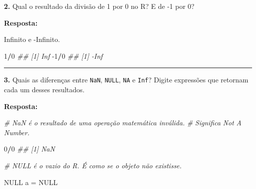 \documentclass[]{book}
\newenvironment{Shaded}{\begin{snugshade}}{\end{snugshade}}
\newcommand{\CommentTok}[1]{\textcolor[rgb]{0.56,0.35,0.01}{\textit{#1}}}
\newcommand{\DecValTok}[1]{\textcolor[rgb]{0.00,0.00,0.81}{#1}}
\newcommand{\NormalTok}[1]{#1}
\newcommand{\OperatorTok}[1]{\textcolor[rgb]{0.81,0.36,0.00}{\textbf{#1}}}
\newcommand{\OtherTok}[1]{\textcolor[rgb]{0.56,0.35,0.01}{#1}}
\newcommand{\StringTok}[1]{\textcolor[rgb]{0.31,0.60,0.02}{#1}}
\begin{document}
\textbf{2.} Qual o resultado da divisão de 1 por 0 no R? E de -1 por 0?

\textbf{Resposta:}

Infinito e -Infinito.

\begin{Shaded}
\begin{Highlighting}[]
\DecValTok{1}\OperatorTok{/}\DecValTok{0}
\CommentTok{## [1] Inf}
\DecValTok{-1}\OperatorTok{/}\DecValTok{0}
\CommentTok{## [1] -Inf}
\end{Highlighting}
\end{Shaded}

\begin{center}\rule{0.5\linewidth}{\linethickness}\end{center}

\textbf{3.} Quais as diferenças entre \texttt{NaN}, \texttt{NULL}, \texttt{NA} e \texttt{Inf}? Digite expressões que retornam cada um desses resultados.

\textbf{Resposta:}

\begin{Shaded}
\begin{Highlighting}[]
\CommentTok{# NaN é o resultado de uma operação matemática inválida. }
\CommentTok{# Significa Not A Number.}

\DecValTok{0}\OperatorTok{/}\DecValTok{0}
\CommentTok{## [1] NaN}
\end{Highlighting}
\end{Shaded}

\begin{Shaded}
\begin{Highlighting}[]
\CommentTok{# NULL é o vazio do R. É como se o objeto não existisse.}

\OtherTok{NULL}
\NormalTok{a =}\StringTok{ }\OtherTok{NULL}
\end{Highlighting}
\end{Shaded}
\end{document}
